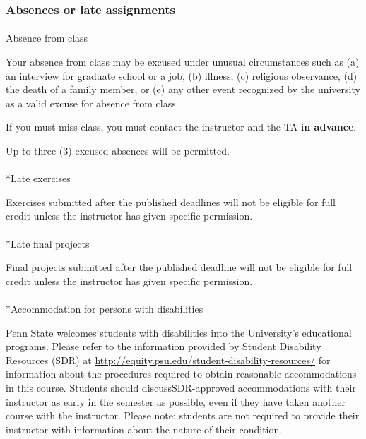 \documentclass[
  letterpaper,
  DIV=11,
  numbers=noendperiod]{scrartcl}
\makeatletter
\let\oldparagraph\paragraph
\renewcommand{\paragraph}{
    \@ifstar
      \xxxParagraphStar
      \xxxParagraphNoStar
  }
\newcommand{\xxxParagraphStar}[1]{\oldparagraph*{#1}\mbox{}}
\newcommand{\xxxParagraphNoStar}[1]{\oldparagraph{#1}\mbox{}}
\makeatother
\begin{document}
\subsubsection*{Absences or late
assignments}\label{late-missed-assignments}

\paragraph{Absence from class}\label{absence-from-class}

Your absence from class may be excused under unusual circumstances such
as (a) an interview for graduate school or a job, (b) illness, (c)
religious observance, (d) the death of a family member, or (e) any other
event recognized by the university as a valid excuse for absence from
class.

If you must miss class, you must contact the instructor and the TA
\textbf{in advance}.

Up to three (3) excused absences will be permitted.

\paragraph*{Late exercises}\label{late-exercises}

Exercises submitted after the published deadlines will not be eligible
for full credit unless the instructor has given specific permission.

\paragraph*{Late final projects}\label{late-final-projects}

Final projects submitted after the published deadline will not be
eligible for full credit unless the instructor has given specific
permission.

\paragraph*{Accommodation for persons with
disabilities}\label{disability-accommodations}

Penn State welcomes students with disabilities into the University's
educational programs. Please refer to the information provided by
Student Disability Resources (SDR) at
\url{http://equity.psu.edu/student-disability-resources/} for
information about the procedures required to obtain reasonable
accommodations in this course. Students should discussSDR-approved
accommodations with their instructor as early in the semester as
possible, even if they have taken another course with the instructor.
Please note: students are not required to provide their instructor with
information about the nature of their condition.
\end{document}
